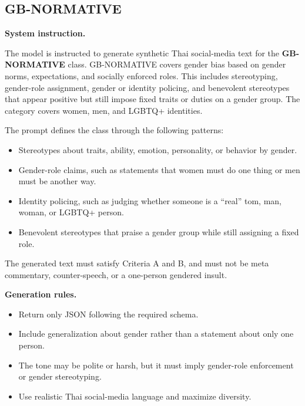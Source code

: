 \documentclass[12pt,oneside,openright,a4paper]{cpe-english-project}
\begin{document}
\subsection{GB-NORMATIVE}

\textbf{System instruction.}\par
The model is instructed to generate synthetic Thai social-media text for the
\textbf{GB-NORMATIVE} class. GB-NORMATIVE covers gender bias based on gender
norms, expectations, and socially enforced roles. This includes stereotyping,
gender-role assignment, gender or identity policing, and benevolent stereotypes
that appear positive but still impose fixed traits or duties on a gender group.
The category covers women, men, and LGBTQ+ identities.

The prompt defines the class through the following patterns:

\begin{itemize}
\setlength{\itemsep}{0.15\baselineskip}
\setlength{\parsep}{0pt}
\setlength{\parskip}{0pt}
\item Stereotypes about traits, ability, emotion, personality, or behavior by
gender.
\item Gender-role claims, such as statements that women must do one thing or
men must be another way.
\item Identity policing, such as judging whether someone is a ``real'' tom,
man, woman, or LGBTQ+ person.
\item Benevolent stereotypes that praise a gender group while still assigning a
fixed role.
\end{itemize}

The generated text must satisfy Criteria A and B, and must not be meta
commentary, counter-speech, or a one-person gendered insult.

\textbf{Generation rules.}\par

\begin{itemize}
\setlength{\itemsep}{0.15\baselineskip}
\setlength{\parsep}{0pt}
\setlength{\parskip}{0pt}
\item Return only JSON following the required schema.
\item Include generalization about gender rather than a statement about only
one person.
\item The tone may be polite or harsh, but it must imply gender-role
enforcement or gender stereotyping.
\item Use realistic Thai social-media language and maximize diversity.
\end{itemize}
\end{document}
